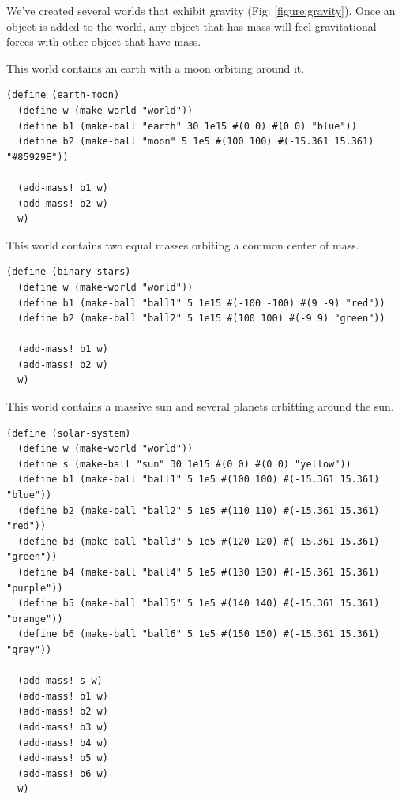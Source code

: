 \documentclass{article}
\begin{document}
We've created several worlds that exhibit gravity (Fig. \ref{figure:gravity}).
Once an object is added to the world, any object that has mass will feel
gravitational forces with other object that have mass.

This world contains an earth with a moon orbiting around it.
{\small\begin{verbatim}
(define (earth-moon)
  (define w (make-world "world"))
  (define b1 (make-ball "earth" 30 1e15 #(0 0) #(0 0) "blue"))
  (define b2 (make-ball "moon" 5 1e5 #(100 100) #(-15.361 15.361) "#85929E"))

  (add-mass! b1 w)
  (add-mass! b2 w)
  w)
\end{verbatim}}


This world contains two equal masses orbiting a common center of mass.

{\small\begin{verbatim}
(define (binary-stars)
  (define w (make-world "world"))
  (define b1 (make-ball "ball1" 5 1e15 #(-100 -100) #(9 -9) "red"))
  (define b2 (make-ball "ball2" 5 1e15 #(100 100) #(-9 9) "green"))

  (add-mass! b1 w)
  (add-mass! b2 w)
  w)
\end{verbatim}}


This world contains a massive sun and several planets orbitting around the sun.

{\small\begin{verbatim}
(define (solar-system)
  (define w (make-world "world"))
  (define s (make-ball "sun" 30 1e15 #(0 0) #(0 0) "yellow"))
  (define b1 (make-ball "ball1" 5 1e5 #(100 100) #(-15.361 15.361) "blue"))
  (define b2 (make-ball "ball2" 5 1e5 #(110 110) #(-15.361 15.361) "red"))
  (define b3 (make-ball "ball3" 5 1e5 #(120 120) #(-15.361 15.361) "green"))
  (define b4 (make-ball "ball4" 5 1e5 #(130 130) #(-15.361 15.361) "purple"))
  (define b5 (make-ball "ball5" 5 1e5 #(140 140) #(-15.361 15.361) "orange"))
  (define b6 (make-ball "ball6" 5 1e5 #(150 150) #(-15.361 15.361) "gray"))

  (add-mass! s w)
  (add-mass! b1 w)
  (add-mass! b2 w)
  (add-mass! b3 w)
  (add-mass! b4 w)
  (add-mass! b5 w)
  (add-mass! b6 w)
  w)
\end{verbatim}}
\end{document}
